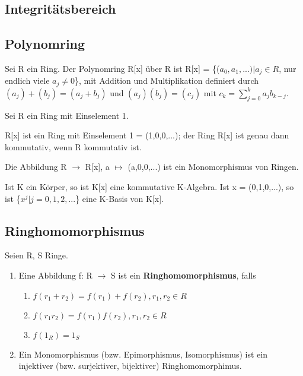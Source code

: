 \subsection{Integritätsbereich}

\subsection{Polynomring}
\begin{definition}
Sei R ein Ring. Der Polynomring R[x] über R ist R[x] = \{($a_0,a_1,...) | a_j \in R$, nur endlich viele $a_j \neq 0$\},
mit Addition und Multiplikation definiert durch $(a_j) + (b_j) = (a_j + b_j)$ und $(a_j)(b_j) = (c_j)$ mit $c_k = \sum\nolimits_{j=0}^{k} a_j b_{k-j}$.
\end{definition}

\begin{lemma}
Sei R ein Ring mit Einselement 1.
\begin{compactenum}
\item R[x] ist ein Ring mit Einselement 1 = (1,0,0,...); der Ring R[x] ist genau dann kommutativ, wenn R kommutativ ist.
\item Die Abbildung R $\to$ R[x], a $\mapsto$ (a,0,0,...) ist ein Monomorphismus von Ringen.
\item Ist K ein Körper, so ist K[x] eine kommutative K-Algebra. Ist x = (0,1,0,...), so ist \{$x^j | j = 0,1,2,...$\} eine K-Basis von K[x].
\end{compactenum}
\end{lemma}


\subsection{Ringhomomorphismus}
\begin{definition}
Seien R, S Ringe.
\begin{enumerate}
\item Eine Abbildung f: R $\to$ S ist ein \textbf{Ringhomomorphismus}, falls
\begin{enumerate}
\item $f(r_1 +r_2) = f(r_1) + f(r_2), r_1,r_2 \in R$
\item $f(r_1r_2) = f(r_1)f(r_2), r_1,r_2 \in R$
\item $f(1_R) = 1_S$
\end{enumerate}
\item Ein Monomorphismus (bzw. Epimorphismus, Isomorphismus) ist ein injektiver (bzw. surjektiver, bijektiver) Ringhomomorphimus.
\end{enumerate}
\end{definition}

